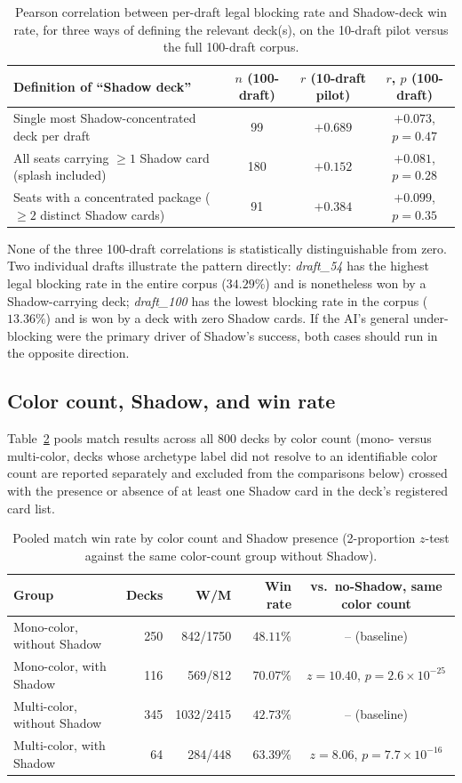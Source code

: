 \documentclass[11pt]{article}
\begin{document}
\begin{table}[h]
\centering
\caption{Pearson correlation between per-draft legal blocking rate and Shadow-deck
win rate, for three ways of defining the relevant deck(s), on the 10-draft pilot
versus the full 100-draft corpus.}
\label{tab:corr}
\small
\begin{tabular}{p{5.6cm}ccc}
\toprule
Definition of ``Shadow deck'' & $n$ (100-draft) & $r$ (10-draft pilot) & $r$, $p$
(100-draft) \\
\midrule
Single most Shadow-concentrated deck per draft & 99 & $+0.689$ & $+0.073$, $p=0.47$ \\
All seats carrying $\geq 1$ Shadow card (splash included) & 180 & $+0.152$ & $+0.081$, $p=0.28$ \\
Seats with a concentrated package ($\geq 2$ distinct Shadow cards) & 91 & $+0.384$ & $+0.099$, $p=0.35$ \\
\bottomrule
\end{tabular}
\end{table}

None of the three 100-draft correlations is statistically distinguishable from zero.
Two individual drafts illustrate the pattern directly: \emph{draft\_54} has the
highest legal blocking rate in the entire corpus ($34.29\%$) and is nonetheless won by
a Shadow-carrying deck; \emph{draft\_100} has the lowest blocking rate in the corpus
($13.36\%$) and is won by a deck with zero Shadow cards. If the AI's general
under-blocking were the primary driver of Shadow's success, both cases should run in
the opposite direction.

\subsection{Color count, Shadow, and win rate}

Table~\ref{tab:crosstab} pools match results across all 800 decks by color count
(mono- versus multi-color, decks whose archetype label did not resolve to an
identifiable color count are reported separately and excluded from the comparisons
below) crossed with the presence or absence of at least one Shadow card in the
deck's registered card list.

\begin{table}[h]
\centering
\caption{Pooled match win rate by color count and Shadow presence (2-proportion
$z$-test against the same color-count group without Shadow).}
\label{tab:crosstab}
\begin{tabular}{lrrrc}
\toprule
Group & Decks & W/M & Win rate & vs.\ no-Shadow, same color count \\
\midrule
Mono-color, without Shadow   & 250 & 842/1750  & $48.11\%$ & -- (baseline) \\
Mono-color, with Shadow      & 116 & 569/812   & $70.07\%$ & $z=10.40$, $p=2.6\times10^{-25}$ \\
Multi-color, without Shadow  & 345 & 1032/2415 & $42.73\%$ & -- (baseline) \\
Multi-color, with Shadow     & 64  & 284/448   & $63.39\%$ & $z=8.06$,  $p=7.7\times10^{-16}$ \\
\bottomrule
\end{tabular}
\end{table}
\end{document}

